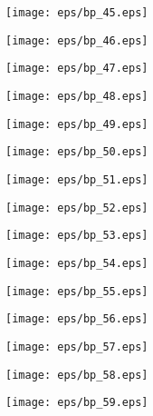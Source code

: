 \documentclass{book}
\begin{document}
	\clearpage\begin{figure}[p]
    \centering
	\texttt{[image: eps/bp\_45.eps]}
	\end{figure}
	\clearpage\begin{figure}[p]
    \centering
	\texttt{[image: eps/bp\_46.eps]}
	\end{figure}
	\clearpage\begin{figure}[p]
    \centering
	\texttt{[image: eps/bp\_47.eps]}
	\end{figure}
	\clearpage\begin{figure}[p]
    \centering
	\texttt{[image: eps/bp\_48.eps]}
	\end{figure}
	\clearpage\begin{figure}[p]
    \centering
	\texttt{[image: eps/bp\_49.eps]}
	\end{figure}
	\clearpage\begin{figure}[p]
    \centering
	\texttt{[image: eps/bp\_50.eps]}
	\end{figure}
	\clearpage\begin{figure}[p]
    \centering
	\texttt{[image: eps/bp\_51.eps]}
	\end{figure}
	\clearpage\begin{figure}[p]
    \centering
	\texttt{[image: eps/bp\_52.eps]}
	\end{figure}
	\clearpage\begin{figure}[p]
    \centering
	\texttt{[image: eps/bp\_53.eps]}
	\end{figure}
	\clearpage\begin{figure}[p]
    \centering
	\texttt{[image: eps/bp\_54.eps]}
	\end{figure}
	\clearpage\begin{figure}[p]
    \centering
	\texttt{[image: eps/bp\_55.eps]}
	\end{figure}
	\clearpage\begin{figure}[p]
    \centering
	\texttt{[image: eps/bp\_56.eps]}
	\end{figure}
	\clearpage\begin{figure}[p]
    \centering
	\texttt{[image: eps/bp\_57.eps]}
	\end{figure}
	\clearpage\begin{figure}[p]
    \centering
	\texttt{[image: eps/bp\_58.eps]}
	\end{figure}
	\clearpage\begin{figure}[p]
    \centering
	\texttt{[image: eps/bp\_59.eps]}
	\end{figure}
\end{document}
